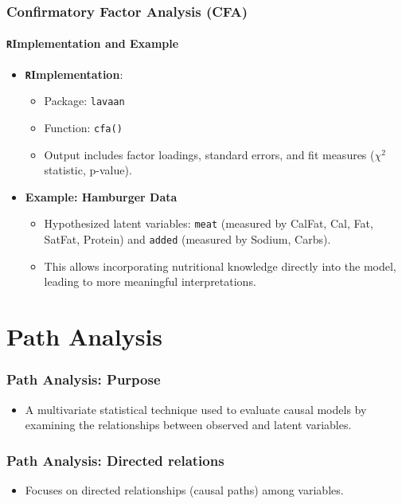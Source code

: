 \documentclass{beamer}
\newcommand{\R}{\texttt{R}}
\newcommand{\code}[1]{\texttt{#1}}
\begin{document}
\begin{frame}
    \frametitle{Confirmatory Factor Analysis (CFA)}
    \framesubtitle{\R Implementation and Example}
    \begin{itemize}
        \item \textbf{\R Implementation}:
            \begin{itemize}
                \item Package: \code{lavaan}
                \item Function: \code{cfa()}
                \item Output includes factor loadings, standard errors, and fit measures ($\chi^2$ statistic, p-value).
            \end{itemize}
        \item \textbf{Example: Hamburger Data}
            \begin{itemize}
                \item Hypothesized latent variables: \code{meat} (measured by CalFat, Cal, Fat, SatFat, Protein) and \code{added} (measured by Sodium, Carbs).
                \item This allows incorporating nutritional knowledge directly into the model, leading to more meaningful interpretations.
            \end{itemize}
    \end{itemize}
\end{frame}

\section{Path Analysis}

\begin{frame}
    \frametitle{Path Analysis: Purpose}
    \begin{itemize}
        \item A multivariate statistical technique used to evaluate \alert{causal models} by examining the relationships between observed and latent variables.
    \end{itemize}
\end{frame}

\begin{frame}
    \frametitle{Path Analysis: Directed relations}
    \begin{itemize}
        \item Focuses on directed relationships (causal paths) among variables.
    \end{itemize}
\end{frame}
\end{document}
